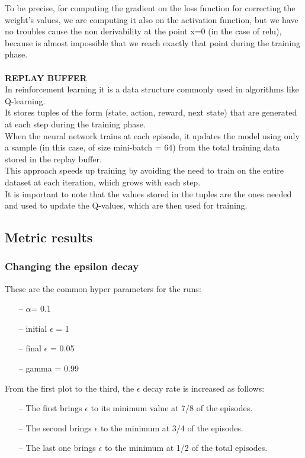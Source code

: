 \documentclass{article}
\begin{document}
To be precise, for computing the gradient on the loss function for correcting the weight's values, we are computing it also on the activation function, but we have no troubles cause the non derivability at the point x=0 (in the case of relu), because is almost impossible that we reach exactly that point during the training phase.
\\
\\
\textbf{REPLAY BUFFER}
\\
In reinforcement learning it is a data structure commonly used in algorithms like Q-learning.
\\
It stores tuples of the form (state, action, reward, next state) that are generated at each step during the training phase.
\\
When the neural network trains at each episode, it updates the model using only a sample (in this case, of size mini-batch = 64) from the total training data stored in the replay buffer. 
\\
This approach speeds up training by avoiding the need to train on the entire dataset at each iteration, which grows with each step.
\\
It is important to note that the values stored in the tuples are the ones needed and used to update the Q-values, which are then used for training.


\subsection{Metric results}


\subsubsection{Changing the epsilon decay}


These are the common hyper parameters for the runs:
\begin{itemize}
\item[--] $\alpha$= 0.1
\item[--] initial $\epsilon$ = 1
\item[--] final $\epsilon$ = 0.05
\item[--] gamma = 0.99
\end{itemize}

From the first plot to the third, the $\epsilon$ decay rate is increased as follows:

\begin{itemize}
\item[--] The first brings $\epsilon$ to its minimum value at 7/8 of the episodes.
\item[--] The second brings $\epsilon$ to the minimum at 3/4 of the episodes.
\item[--] The last one brings $\epsilon$ to the minimum at 1/2 of the total episodes.
\end{itemize}
\end{document}

